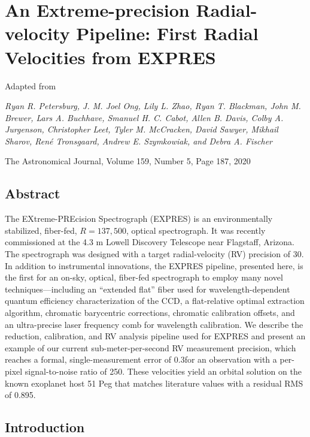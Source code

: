 \chapter{An Extreme-precision Radial-velocity Pipeline: First Radial Velocities from EXPRES}\label{chapter:pipeline}

\begin{center}
    Adapted from

    \textit{Ryan R. Petersburg, J. M. Joel Ong, Lily L. Zhao, Ryan T. Blackman, John M. Brewer, Lars A. Buchhave, Smanuel H. C. Cabot, Allen B. Davis, Colby A. Jurgenson, Christopher Leet, Tyler M. McCracken, David Sawyer, Mikhail Sharov, René Tronsgaard, Andrew E. Szymkowiak, and Debra A. Fischer}
    
    The Astronomical Journal, Volume 159, Number 5, Page 187, 2020
\end{center}

\section*{Abstract}

The EXtreme-PREcision Spectrograph (EXPRES) is an environmentally stabilized, fiber-fed, $R=137,500$, optical spectrograph. It was recently commissioned at the 4.3 m Lowell Discovery Telescope near Flagstaff, Arizona. The spectrograph was designed with a target radial-velocity (RV) precision of 30\cms. In addition to instrumental innovations, the EXPRES pipeline, presented here, is the first for an on-sky, optical, fiber-fed spectrograph to employ many novel techniques---including an ``extended flat'' fiber used for wavelength-dependent quantum efficiency characterization of the CCD, a flat-relative optimal extraction algorithm, chromatic barycentric corrections, chromatic calibration offsets, and an ultra-precise laser frequency comb for wavelength calibration. We describe the reduction, calibration, and RV analysis pipeline used for EXPRES and present an example of our current sub-meter-per-second RV measurement precision, which reaches a formal, single-measurement error of 0.3\ms for an observation with a per-pixel signal-to-noise ratio of 250. These velocities yield an orbital solution on the known exoplanet host 51 Peg that matches literature values with a residual RMS of 0.895\ms.

\section{Introduction}\label{introduction}

